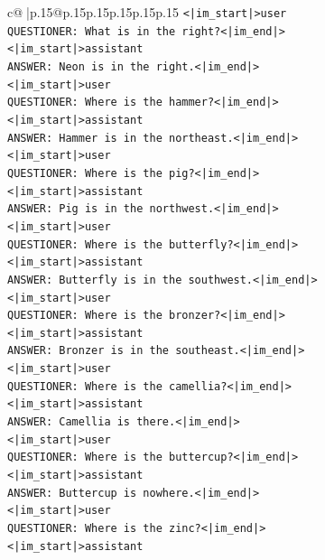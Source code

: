 \documentclass{article}
\begin{document}
{\begin{supertabular}{c@{$\;$}|p{.15\linewidth}@{}p{.15\linewidth}p{.15\linewidth}p{.15\linewidth}p{.15\linewidth}p{.15\linewidth}}
{{{\texttt{<|im\_start|>user} \\
\texttt{QUESTIONER: What is in the right?<|im\_end|>} \\
\texttt{<|im\_start|>assistant} \\
\texttt{ANSWER: Neon is in the right.<|im\_end|>} \\
\texttt{<|im\_start|>user} \\
\texttt{QUESTIONER: Where is the hammer?<|im\_end|>} \\
\texttt{<|im\_start|>assistant} \\
\texttt{ANSWER: Hammer is in the northeast.<|im\_end|>} \\
\texttt{<|im\_start|>user} \\
\texttt{QUESTIONER: Where is the pig?<|im\_end|>} \\
\texttt{<|im\_start|>assistant} \\
\texttt{ANSWER: Pig is in the northwest.<|im\_end|>} \\
\texttt{<|im\_start|>user} \\
\texttt{QUESTIONER: Where is the butterfly?<|im\_end|>} \\
\texttt{<|im\_start|>assistant} \\
\texttt{ANSWER: Butterfly is in the southwest.<|im\_end|>} \\
\texttt{<|im\_start|>user} \\
\texttt{QUESTIONER: Where is the bronzer?<|im\_end|>} \\
\texttt{<|im\_start|>assistant} \\
\texttt{ANSWER: Bronzer is in the southeast.<|im\_end|>} \\
\texttt{<|im\_start|>user} \\
\texttt{QUESTIONER: Where is the camellia?<|im\_end|>} \\
\texttt{<|im\_start|>assistant} \\
\texttt{ANSWER: Camellia is there.<|im\_end|>} \\
\texttt{<|im\_start|>user} \\
\texttt{QUESTIONER: Where is the buttercup?<|im\_end|>} \\
\texttt{<|im\_start|>assistant} \\
\texttt{ANSWER: Buttercup is nowhere.<|im\_end|>} \\
\texttt{<|im\_start|>user} \\
\texttt{QUESTIONER: Where is the zinc?<|im\_end|>} \\
\texttt{<|im\_start|>assistant} \\
}}}
\end{supertabular}}
\end{document}
